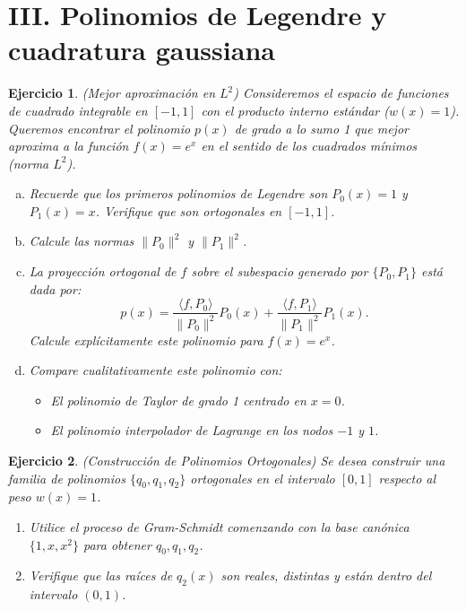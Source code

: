 \documentclass[12pt]{article}
\newtheorem{exercise}{Ejercicio}
\newcommand{\bej}{\begin{exercise}\rm}
\newcommand{\fej}{\end{exercise}}
\begin{document}
\section*{III. Polinomios de Legendre y cuadratura gaussiana}

\bej
(Mejor aproximación en $L^2$)
Consideremos el espacio de funciones de cuadrado integrable en $[-1, 1]$ con el producto interno estándar ($w(x)=1$). Queremos encontrar el polinomio $p(x)$ de grado a lo sumo 1 que mejor aproxima a la función $f(x) = e^x$ en el sentido de los cuadrados mínimos (norma $L^2$).
\begin{enumerate}[(a)]
    \item Recuerde que los primeros polinomios de Legendre son $P_0(x) = 1$ y $P_1(x) = x$. Verifique que son ortogonales en $[-1, 1]$.
    \item Calcule las normas $\|P_0\|^2$ y $\|P_1\|^2$.
    \item La proyección ortogonal de $f$ sobre el subespacio generado por $\{P_0, P_1\}$ está dada por:
    \[
    p(x) = \frac{\langle f, P_0 \rangle}{\|P_0\|^2} P_0(x) + \frac{\langle f, P_1 \rangle}{\|P_1\|^2} P_1(x).
    \]
    Calcule explícitamente este polinomio para $f(x) = e^x$.
    \item Compare cualitativamente este polinomio con:
    \begin{itemize}
        \item El polinomio de Taylor de grado 1 centrado en $x=0$.
        \item El polinomio interpolador de Lagrange en los nodos $-1$ y $1$.
    \end{itemize}
\end{enumerate}
\fej

\bej
(Construcción de Polinomios Ortogonales)
Se desea construir una familia de polinomios $\{q_0, q_1, q_2\}$ ortogonales en el intervalo $[0, 1]$ respecto al peso $w(x) = 1$.
\begin{enumerate}
    \item Utilice el proceso de Gram-Schmidt comenzando con la base canónica $\{1, x, x^2\}$ para obtener $q_0, q_1, q_2$.
    \item Verifique que las raíces de $q_2(x)$ son reales, distintas y están dentro del intervalo $(0, 1)$.
\end{enumerate}
\fej
\end{document}
